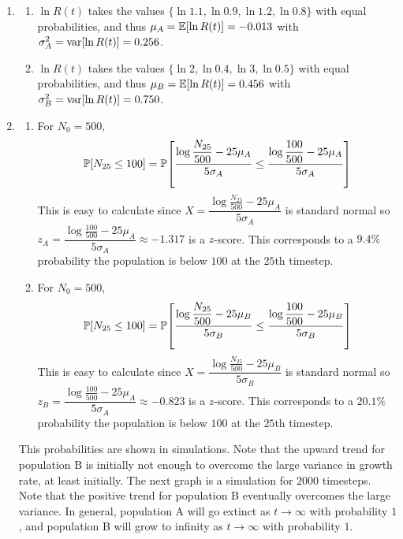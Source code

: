 \documentclass{article} %
\theoremstyle{plain}
\newcommand{\expec}[1]{\mathbb{E}\qty[#1]}
\newcommand{\prob}[1]{\mathbb{P}\qty[#1]}
\newcommand{\vari}[1]{\text{var}\qty[#1]}
\numberwithin{equation}{section} %
\numberwithin{figure}{section} %
\numberwithin{table}{section} %
\begin{document}
\begin{enumerate}[\ \ (a)]
    \item
        \begin{enumerate}[Pop.~A:\ ]
            \item
                $\ln R(t)$ takes the values $\{\ln1.1, \ln0.9, \ln1.2, \ln0.8\}$ with equal probabilities, and thus $\mu_A = \expec{\ln R(t)} = -0.013$ with $\sigma_A^2 = \vari{\ln R(t)} = 0.256$.
            \item
                $\ln R(t)$ takes the values $\{\ln2,\ln0.4,\ln3,\ln0.5\}$ with equal probabilities, and thus $\mu_B = \expec{\ln R(t)} = 0.456$ with $\sigma_B^2 = \vari{\ln R(t)} = 0.750$.
        \end{enumerate}
    \item
        \begin{enumerate}[Pop.~A:\ ]
            \item
                For $N_0 = 500$,
                \begin{align}
                    \prob{N_{25}\leq 100} = \prob{\frac{\log \dfrac{N_{25}}{500} - 25\mu_A}{5\sigma_A} \leq \frac{\log\dfrac{100}{500} - 25\mu_A}{5\sigma_A}}
                \end{align}
                This is easy to calculate since $X = \dfrac{\log \frac{N_{25}}{500} - 25\mu_A}{5\sigma_A}$ is standard normal so $z_A = \dfrac{\log\frac{100}{500} - 25\mu_A}{5\sigma_A} \approx -1.317$ is a $z$-score.  This corresponds to a $9.4\%$ probability the population is below $100$ at the $25$th timestep.
            \item
                For $N_0 = 500$,
                \begin{align}
                    \prob{N_{25}\leq 100} = \prob{\frac{\log \dfrac{N_{25}}{500} - 25\mu_B}{5\sigma_B} \leq \frac{\log\dfrac{100}{500} - 25\mu_B}{5\sigma_B}}
                \end{align}
                This is easy to calculate since $X = \dfrac{\log \frac{N_{25}}{500} - 25\mu_B}{5\sigma_B}$ is standard normal so $z_B = \dfrac{\log\frac{100}{500} - 25\mu_A}{5\sigma_A} \approx -0.823$ is a $z$-score.  This corresponds to a $20.1\%$ probability the population is below $100$ at the $25$th timestep.
        \end{enumerate}
        This probabilities are shown in simulations.  Note that the upward trend for population B is initially not enough to overcome the large variance in growth rate, at least initially.  The next graph is a simulation for $2000$ timesteps.  Note that the positive trend for population B eventually overcomes the large variance.  In general, population A will go extinct as $t \rightarrow \infty$ with probability $1$, and population B will grow to infinity as $t \rightarrow \infty$ with probability $1$.

\end{enumerate}
\end{document}
